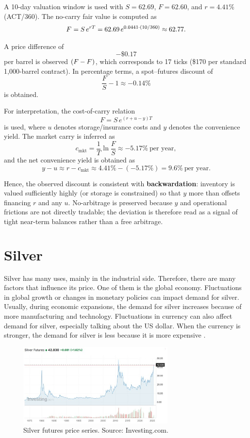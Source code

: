 \documentclass[10pt,a4paper]{article} %
\let\oldsection\section
\renewcommand{\section}{%
      \clearpage
      \thispagestyle{myfancy}%
      \oldsection
    }
\begin{document}
A 10-day valuation window is used with $S=62.69$, $F=62.60$, and $r=4.41\%$ (ACT/360). The no-carry fair value is computed as
\[
F^{\*}=S\,e^{rT}=62.69\,e^{0.0441\cdot(10/360)}\approx62.77.
\]

A price difference of
\[
-\$0.17
\]
per barrel is observed $(F-F^{\*})$, which corresponds to 17 ticks (\$170 per standard 1,000-barrel contract). In percentage terms, a spot–futures discount of
\[
\frac{F}{S}-1 \approx -0.14\%
\]
is obtained.

For interpretation, the cost-of-carry relation
\[
F=S\,e^{(r+u-y)T}
\]
is used, where $u$ denotes storage/insurance costs and $y$ denotes the convenience yield. The market carry is inferred as
\[
c_{\text{mkt}}=\frac{1}{T}\ln\!\frac{F}{S}\approx-5.17\%\ \text{per year},
\]
and the net convenience yield is obtained as
\[
y-u \approx r-c_{\text{mkt}}\approx 4.41\%-(-5.17\%)=9.6\% \ \text{per year}.
\]

Hence, the observed discount is consistent with \textbf{backwardation}: inventory is valued sufficiently highly (or storage is constrained) so that $y$ more than offsets financing $r$ and any $u$. No-arbitrage is preserved because $y$ and operational frictions are not directly tradable; the deviation is therefore read as a signal of tight near-term balances rather than a free arbitrage.



\section{Silver}
Silver has many uses, mainly in the industrial side. Therefore, there are many factors that influence its price. One of them is the global economy. Fluctuations in global growth or changes in monetary policies can impact demand for silver. Usually, during economic expansions, the demand for silver increases because of more manufacturing and technology. Fluctuations in currency can also affect demand for silver, especially talking about the US dollar. When the currency is stronger, the demand for silver is less because it is more expensive \citep{silver_institute_wss_2024,usgs_silver_mcs_2024,bis_usd_commodity_2023}.

\begin{figure}[h]
\centering
\includegraphics[width=0.7\textwidth]{figures/silver_time_series.jpg}
\caption{Silver futures price series. Source: Investing.com.}
\end{figure}
\end{document}
